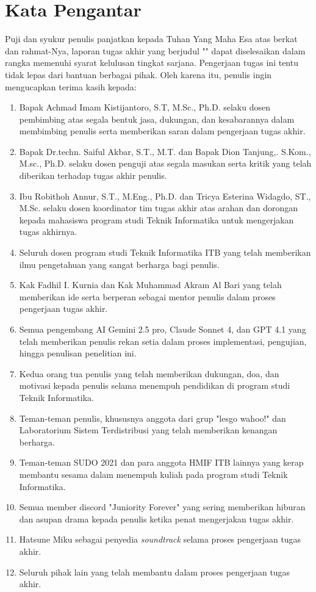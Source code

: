 \chapter*{Kata Pengantar}

Puji dan syukur penulis panjatkan kepada Tuhan Yang Maha Esa atas berkat dan rahmat-Nya, laporan tugas akhir yang berjudul "\thetitle" dapat diselesaikan dalam rangka memenuhi syarat kelulusan tingkat sarjana. Pengerjaan tugas ini tentu tidak lepas dari bantuan berbagai pihak. Oleh karena itu, penulis ingin mengucapkan terima kasih kepada:

\begin{enumerate}
	\item Bapak Achmad Imam Kistijantoro, S.T, M.Sc., Ph.D. selaku dosen pembimbing atas segala bentuk jasa, dukungan, dan kesabarannya dalam membimbing penulis serta memberikan saran dalam pengerjaan tugas akhir.
	\item Bapak Dr.techn. Saiful Akbar, S.T., M.T. dan Bapak Dion Tanjung,. S.Kom., M.sc., Ph.D. selaku dosen penguji atas segala masukan serta kritik yang telah diberikan terhadap tugas akhir penulis.
	\item Ibu Robithoh Annur, S.T., M.Eng., Ph.D. dan Tricya Esterina Widagdo, ST., M.Sc. selaku dosen koordinator tim tugas akhir atas arahan dan dorongan kepada mahasiswa program studi Teknik Informatika untuk mengerjakan tugas akhirnya.
	\item Seluruh dosen program studi Teknik Informatika ITB yang telah memberikan ilmu pengetahuan yang sangat berharga bagi penulis.
	\item Kak Fadhil I. Kurnia dan Kak Muhammad Akram Al Bari yang telah memberikan ide serta berperan sebagai mentor penulis dalam proses pengerjaan tugas akhir.
	\item Semua pengembang AI Gemini 2.5 pro, Claude Sonnet 4, dan GPT 4.1 yang telah memberikan penulis rekan setia dalam proses implementasi, pengujian, hingga penulisan penelitian ini.
	\item Kedua orang tua penulis yang telah memberikan dukungan, doa, dan motivasi kepada penulis selama menempuh pendidikan di program studi Teknik Informatika.
	\item Teman-teman penulis, khususnya anggota dari grup "lesgo wahoo!" dan Laboratorium Sistem Terdistribusi yang telah memberikan kenangan berharga.
	\item Teman-teman SUDO 2021 dan para anggota HMIF ITB lainnya yang kerap membantu sesama dalam menempuh kuliah pada program studi Teknik Informatika.
	\item Semua member discord "Juniority Forever" yang sering memberikan hiburan dan asupan drama kepada penulis ketika penat mengerjakan tugas akhir.
	\item Hatsune Miku sebagai penyedia \textit{soundtrack} selama proses pengerjaan tugas akhir.
	\item Seluruh pihak lain yang telah membantu dalam proses pengerjaan tugas akhir.
\end{enumerate}

